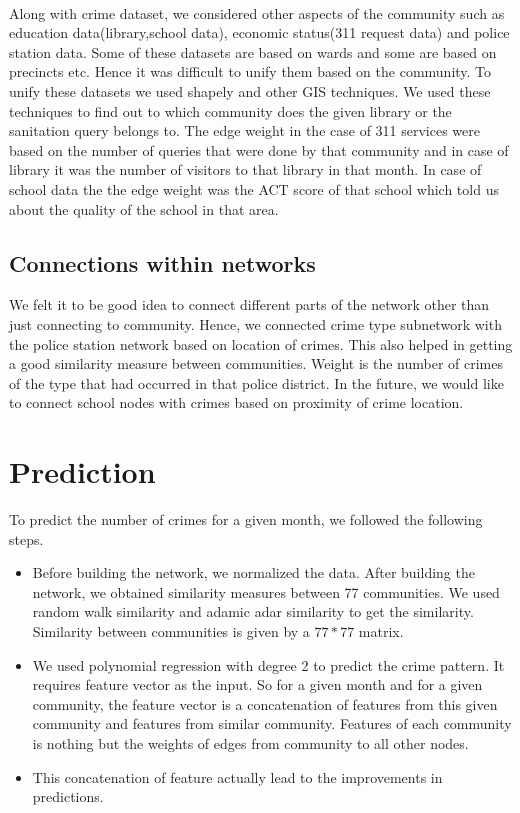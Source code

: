 \documentclass{article}
\begin{document}
\paragraph{}
Along with crime dataset, we considered other aspects of the community such as education data(library,school data), economic status(311 request data) and police station data. Some of these datasets are based on wards and some are based on precincts etc. Hence it was difficult to unify them based on the community. To unify these datasets we used shapely and other GIS techniques. We used these techniques to find out to which community does the given library or the sanitation query belongs to. The edge weight in the case of 311 services were based on the number of queries that were done by that community and in case of library it was the number of visitors to that library in that month. In case of school data the the edge weight was the ACT score of that school which told us about the quality of the school in that area.

\subsection{Connections within networks}
We felt it to be good idea to connect different parts of the network other than just connecting to community. Hence, we connected crime type subnetwork with the police station network based on location of crimes. This also helped in getting a good similarity measure between communities.  Weight is the number of crimes of the type that had occurred in that police district. In the future, we would like to connect school nodes with crimes based on proximity of crime location.

\section{Prediction}
To predict the number of crimes for a given month, we followed the following steps.
\begin{itemize}
\item Before building the network, we normalized the data. After building the network, we obtained similarity measures between 77 communities. We used random walk similarity and adamic adar similarity to get the similarity. Similarity between communities is given by a $77 * 77$ matrix.
\item We used polynomial regression with degree 2 to predict the crime pattern. It requires feature vector as the input. So for a given month and for a given community, the feature vector is a concatenation of features from this given community and features from similar community. Features of each community is nothing but the weights of edges from community to all other nodes.
\item This concatenation of feature actually lead to the improvements in predictions.
\end{itemize}
\end{document}
